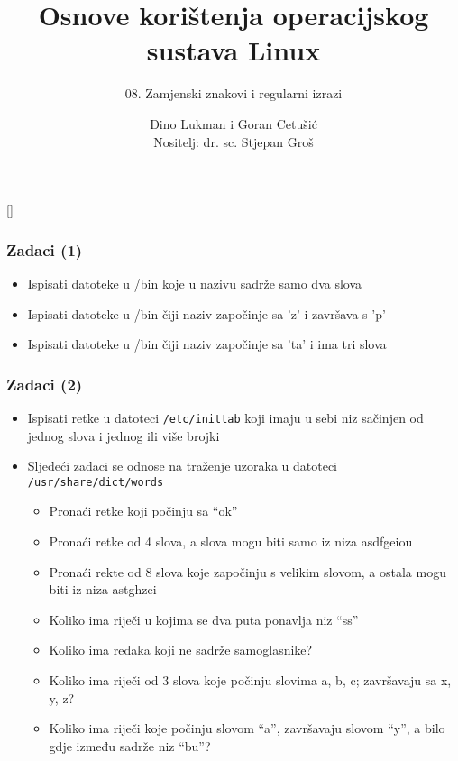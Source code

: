 \documentclass[table,usenames,dvipsnames]{beamer}
\title{Osnove korištenja operacijskog sustava Linux}
\subtitle{08. Zamjenski znakovi i regularni izrazi}
\author[Dino Lukman i Goran Cetušić]{Dino Lukman i Goran Cetušić\\{\small Nositelj: dr. sc. Stjepan Groš}}
\institute[FER]{Sveučilište u Zagrebu \\
				Fakultet elektrotehnike i računarstva}
\date{\todayiso}
\newcommand{\shell}[1]{\texttt{#1}}
\begin{document}
{
[] %

\begin{frame}
\maketitle
\end{frame}
}

\begin{frame}[t]
\frametitle{Zadaci (1)}
\begin{itemize}
  \item Ispisati datoteke u /bin koje u nazivu sadrže samo dva slova
  \item Ispisati datoteke u /bin čiji naziv započinje sa 'z' i završava s 'p'
  \item Ispisati datoteke u /bin čiji naziv započinje sa 'ta' i ima tri slova
\end{itemize}
\end{frame}

\begin{frame}[t]
\frametitle{Zadaci (2)}
\begin{itemize}
  \item Ispisati retke u datoteci \shell{/etc/inittab} koji imaju u sebi 
        niz sačinjen od jednog slova i jednog ili više brojki
  \item Sljedeći zadaci se odnose na traženje uzoraka u datoteci 
        \shell{/usr/share/dict/words}
  \begin{itemize}
    \item Pronaći retke koji počinju sa ``ok''
    \item Pronaći retke od 4 slova, a slova mogu biti samo iz niza asdfgeiou
    \item Pronaći rekte od 8 slova koje započinju s velikim slovom, a ostala mogu biti iz niza astghzei
    \item Koliko ima riječi u kojima se dva puta ponavlja niz ``ss''
    \item Koliko ima redaka koji ne sadrže samoglasnike?
    \item Koliko ima riječi od 3 slova koje počinju slovima a, b, c; 
        završavaju sa x, y, z?
    \item Koliko ima riječi koje počinju slovom ``a'', završavaju slovom 
        ``y'', a bilo gdje između sadrže niz ``bu''?
  \end{itemize}
\end{itemize}
\end{frame}
\end{document}
